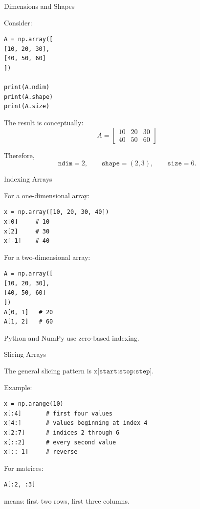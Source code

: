 \documentclass[11pt,aspectratio=43]{beamer}
\begin{document}
\begin{frame}[fragile]{Dimensions and Shapes}

Consider:
\begin{lstlisting}
A = np.array([
[10, 20, 30],
[40, 50, 60]
])

print(A.ndim)
print(A.shape)
print(A.size)
\end{lstlisting}

The result is conceptually:
\[
A =
\begin{bmatrix}
10 & 20 & 30\\
40 & 50 & 60
\end{bmatrix}
\]

Therefore,
\[
\texttt{ndim}=2,\qquad
\texttt{shape}=(2,3),\qquad
\texttt{size}=6.
\]

\end{frame}

\begin{frame}[fragile]{Indexing Arrays}

For a one-dimensional array:
\begin{lstlisting}
x = np.array([10, 20, 30, 40])
x[0]     # 10
x[2]     # 30
x[-1]    # 40
\end{lstlisting}

For a two-dimensional array:
\begin{lstlisting}
A = np.array([
[10, 20, 30],
[40, 50, 60]
])
A[0, 1]   # 20
A[1, 2]   # 60
\end{lstlisting}

\begin{alertblock}{}
Python and NumPy use zero-based indexing.
\end{alertblock}

\end{frame}

\begin{frame}[fragile]{Slicing Arrays}

The general slicing pattern is $\texttt{x[start:stop:step]}.$

Example:
\begin{lstlisting}
x = np.arange(10)
x[:4]       # first four values
x[4:]       # values beginning at index 4
x[2:7]      # indices 2 through 6
x[::2]      # every second value
x[::-1]     # reverse
\end{lstlisting}

For matrices:
\begin{lstlisting}
A[:2, :3]
\end{lstlisting}

means: first two rows, first three columns.

\end{frame}
\end{document}
